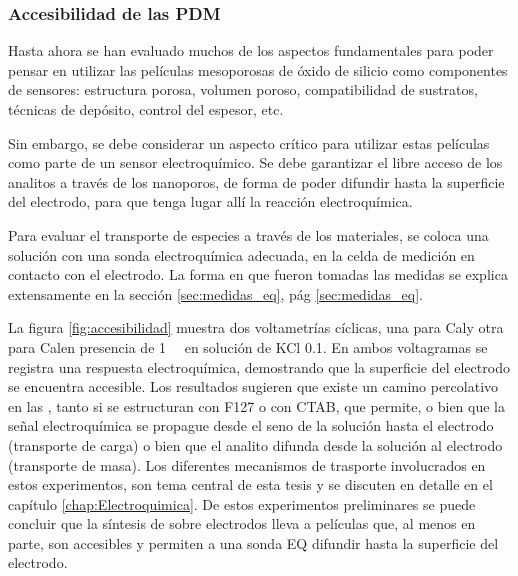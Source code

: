 	    \subsubsection{Accesibilidad de las PDM}\label{sec:acc}

			Hasta ahora se han evaluado muchos de los aspectos fundamentales para poder pensar en utilizar las películas mesoporosas de óxido de silicio como componentes de sensores: estructura porosa, volumen poroso, compatibilidad de sustratos, técnicas de depósito, control del espesor, etc. 

			Sin embargo, se debe considerar un aspecto crítico para utilizar estas películas como parte de un sensor electroquímico. Se debe garantizar el libre acceso de los analitos a través de los nanoporos, de forma de poder difundir hasta la superficie del electrodo, para que tenga lugar allí la reacción electroquímica.

			Para evaluar el transporte de especies a través de los materiales, se coloca una solución con una sonda electroquímica adecuada, en la celda de medición en contacto con el electrodo. La forma en que fueron tomadas las medidas se explica extensamente en la sección \ref{sec:medidas_eq}, pág \ref{sec:medidas_eq}. 

			La figura \ref{fig:accesibilidad} muestra dos voltametrías cíclicas, una para Cal\pdmF\space y otra para Cal\pdmC\space en presencia de \aminorutenio\space \SI{1}{\milli\Molar} en solución de KCl \SI{0.1}{\Molar}. En ambos voltagramas se registra una respuesta electroquímica, demostrando que la superficie del electrodo se encuentra accesible. Los resultados sugieren que existe un camino percolativo en las \pdm, tanto si se estructuran con F127 o con CTAB, que permite, o bien que la señal electroquímica se propague desde el seno de la solución hasta el electrodo (transporte de carga) o bien que el analito difunda desde la solución al electrodo (transporte de masa). Los diferentes mecanismos de trasporte involucrados en estos experimentos, son tema central de esta tesis y se discuten en detalle en el capítulo \ref{chap:Electroquimica}. De estos experimentos preliminares se puede concluir que la síntesis de \pdm\space sobre electrodos lleva a películas que, al menos en parte, son accesibles y permiten a una sonda EQ difundir hasta la superficie del electrodo.   

